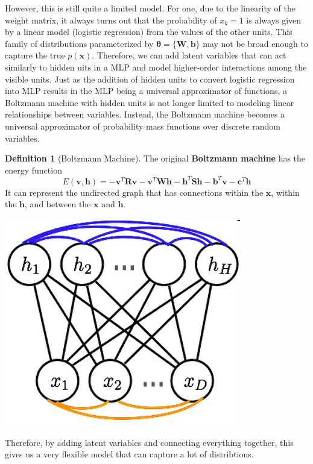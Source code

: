 \documentclass{article}
\theoremstyle{definition}
\theoremstyle{remark}
\theoremstyle{definition}
\newtheorem{definition}{Definition}[section]
\begin{document}
    However, this is still quite a limited model. For one, due to the linearity of the weight matrix, it always turns out that the probability of $x_k = 1$ is always given by a linear model (logistic regression) from the values of the other units. This family of distributions parameterized by $\boldsymbol{\theta} = \{\mathbf{W}, \mathbf{b}\}$ may not be broad enough to capture the true $p(\mathbf{x})$. Therefore, we can add latent variables that can act similarly to hidden uits in a MLP and model higher-order interactions among the visible units. Just as the addition of hidden units to convert logistic regression into MLP results in the MLP being a universal approximator of functions, a Boltzmann machine with hidden units is not longer limited to modeling linear relationships between variables. Instead, the Boltzmann machine becomes a universal approximator of probability mass functions over discrete random variables. 

    \begin{definition}[Boltzmann Machine]
      The original \textbf{Boltzmann machine} has the energy function 
        \[E(\mathbf{v}, \mathbf{h}) = - \mathbf{v}^T \mathbf{R} \mathbf{v} - \mathbf{v}^T \mathbf{W} \mathbf{h} - \mathbf{h}^T \mathbf{S} \mathbf{h} - \mathbf{b}^T \mathbf{v} - \mathbf{c}^T \mathbf{h} \]
      It can represent the undirected graph that has connections within the $\mathbf{x}$, within the $\mathbf{h}$, and between the $\mathbf{x}$ and $\mathbf{h}$.
      \begin{center} 
        \includegraphics[scale=0.4]{Images/Boltzmann_lateral.png}
      \end{center}
      Therefore, by adding latent variables and connecting everything together, this gives us a very flexible model that can capture a lot of distribtions.
    \end{definition} 
\end{document}
